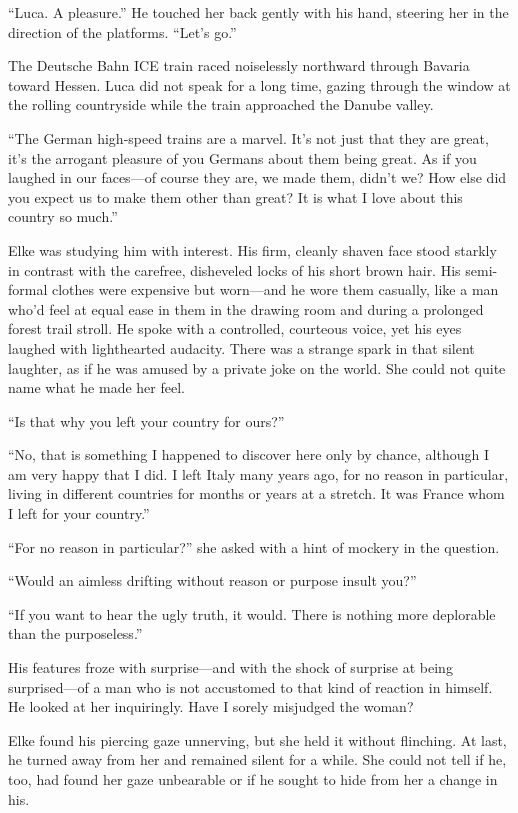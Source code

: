 ``Luca. A pleasure.'' He touched her back gently with his hand, steering her in the direction of the platforms. ``Let's go.''

\sectionline

The Deutsche Bahn ICE train raced noiselessly northward through Bavaria toward Hessen. Luca did not speak for a long time, gazing through the window at the rolling countryside while the train approached the Danube valley.

``The German high-speed trains are a marvel. It's not just that they are great, it's the arrogant pleasure of you Germans about them being great. As if you laughed in our faces---of course they are, we made them, didn't we? How else did you expect us to make them other than great? It is what I love about this country so much.''

Elke was studying him with interest. His firm, cleanly shaven face stood starkly in contrast with the carefree, disheveled locks of his short brown hair. His semi-formal clothes were expensive but worn---and he wore them casually, like a man who'd feel at equal ease in them in the drawing room and during a prolonged forest trail stroll. He spoke with a controlled, courteous voice, yet his eyes laughed with lighthearted audacity. There was a strange spark in that silent laughter, as if he was amused by a private joke on the world. She could not quite name what he made her feel.

``Is that why you left your country for ours?''

``No, that is something I happened to discover here only by chance, although I am very happy that I did. I left Italy many years ago, for no reason in particular, living in different countries for months or years at a stretch. It was France whom I left for your country.''

``For no reason in particular?'' she asked with a hint of mockery in the question.

``Would an aimless drifting without reason or purpose insult you?''

``If you want to hear the ugly truth, it would. There is nothing more deplorable than the purposeless.''

His features froze with surprise---and with the shock of surprise at being surprised---of a man who is not accustomed to that kind of reaction in himself. He looked at her inquiringly. Have I sorely misjudged the woman?

Elke found his piercing gaze unnerving, but she held it without flinching. At last, he turned away from her and remained silent for a while. She could not tell if he, too, had found her gaze unbearable or if he sought to hide from her a change in his.

